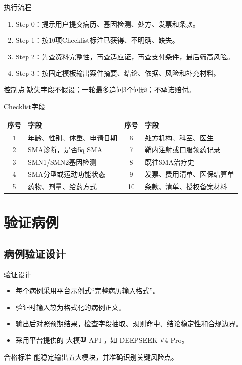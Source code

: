 \documentclass{beamer}
\begin{document}
\begin{frame}[fragile]{执行流程}
  \begin{enumerate}
    \item Step 0：提示用户提交病历、基因检测、处方、发票和条款。
    \item Step 1：按10项Checklist标注已获得、不明确、缺失。
    \item Step 2：先查资料完整性，再查适应证，再查支付条件，最后筛高风险。
    \item Step 3：按固定模板输出案件摘要、结论、依据、风险和补充材料。
  \end{enumerate}
  \vspace{0.5em}
  \begin{block}{控制点}
    缺失字段不假设；一轮最多追问3个问题；不承诺赔付。
  \end{block}
\end{frame}

\begin{frame}[fragile]{Checklist字段}
  \begin{tabularx}{\textwidth}{c X c X}
    \toprule
    序号 & 字段 & 序号 & 字段 \\
    \midrule
    1 & 年龄、性别、体重、申请日期 & 6 & 处方机构、科室、医生 \\
    2 & SMA诊断，是否5q SMA & 7 & 鞘内注射或口服领药记录 \\
    3 & SMN1/SMN2基因检测 & 8 & 既往SMA治疗史 \\
    4 & SMA分型或运动功能状态 & 9 & 发票、费用清单、医保结算单 \\
    5 & 药物、剂量、给药方式 & 10 & 条款、清单、授权备案材料 \\
    \bottomrule
  \end{tabularx}
\end{frame}

\section{验证病例}
\subsection{病例验证设计}
\begin{frame}[fragile]{验证设计}
  \begin{itemize}
    \item 每个病例采用平台示例式“完整病历输入格式”。
    \item 验证时输入较为格式化的病例正文。
    \item 输出后对照预期结果，检查字段抽取、规则命中、结论稳定性和合规边界。
    \item 采用平台提供的 大模型 API ，如 DEEPSEEK-V4-Pro。
  \end{itemize}
  \vspace{0.5em}
  \begin{block}{合格标准}
    能稳定输出五大模块，并准确识别关键风险点。
  \end{block}
\end{frame}
\end{document}
